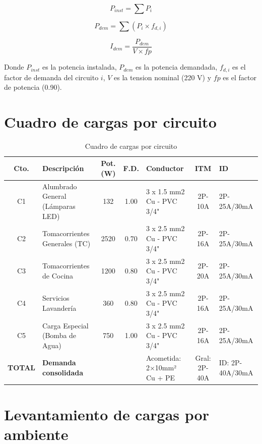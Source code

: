 \begin{equation}
P_{inst} = \sum P_i
\end{equation}

\begin{equation}
P_{dem} = \sum (P_i \times f_{d,i})
\end{equation}

\begin{equation}
I_{dem} = \frac{P_{dem}}{V \times fp}
\end{equation}

Donde $P_{inst}$ es la potencia instalada, $P_{dem}$ es la potencia demandada, $f_{d,i}$ es el factor de demanda del circuito $i$, $V$ es la tension nominal (220 V) y $fp$ es el factor de potencia (0.90).

\section{Cuadro de cargas por circuito}

\begin{table}[H]
\centering
\footnotesize
\setlength{\tabcolsep}{2.5pt}
\caption{Cuadro de cargas por circuito}
\label{tab:cuadro-cargas}
\begin{tabularx}{\textwidth}{c L{3.2cm} c c L{3.2cm} c L{2.2cm}}
\toprule
\textbf{Cto.} & \textbf{Descripción} & \textbf{Pot. (W)} & \textbf{F.D.} & \textbf{Conductor} & \textbf{ITM} & \textbf{ID} \\
\midrule
C1 & Alumbrado General (Lámparas LED) & 132 & 1.00 & 3 x 1.5 mm2 Cu - PVC 3/4" & 2P-10A & 2P-25A/30mA \\
C2 & Tomacorrientes Generales (TC) & 2520 & 0.70 & 3 x 2.5 mm2 Cu - PVC 3/4" & 2P-16A & 2P-25A/30mA \\
C3 & Tomacorrientes de Cocina & 1200 & 0.80 & 3 x 2.5 mm2 Cu - PVC 3/4" & 2P-20A & 2P-25A/30mA \\
C4 & Servicios Lavandería & 360 & 0.80 & 3 x 2.5 mm2 Cu - PVC 3/4" & 2P-16A & 2P-25A/30mA \\
C5 & Carga Especial (Bomba de Agua) & 750 & 1.00 & 3 x 2.5 mm2 Cu - PVC 3/4" & 2P-16A & 2P-25A/30mA \\
\midrule
\textbf{TOTAL} & \textbf{Demanda consolidada} & & & Acometida: 2×10mm² Cu + PE & Gral: 2P-40A & ID: 2P-40A/30mA \\
\bottomrule
\end{tabularx}
\end{table}

\section{Levantamiento de cargas por ambiente}

